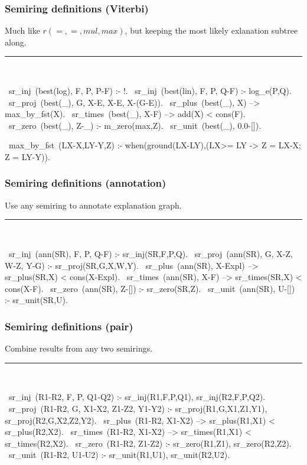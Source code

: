 \documentclass[usenames,dvipsnames]{beamer}
\newenvironment{isframe}[1][untitled]{\begin{frame}[fragile=singleslide,environment=isframe]\frametitle{#1}}{\end{frame}}
\begin{document}
\begin{isframe}[Semiring definitions (Viterbi)]
  Much like $r(=,=,mul,max)$, but keeping the most likely exlanation
  subtree along.
  \rule{\linewidth}{0.4pt}\\
  \begin{prolog}[xleftmargin=0em,deletekeywords={ground},basicstyle=\small]
  ~sr_inj~(best(log), F, P, P-F) :- !.
  ~sr_inj~(best(lin), F, P, Q-F)   :- log_e(P,Q).
  ~sr_proj~(best(_),  G, X-E, X-E, X-(G-E)).
  ~sr_plus~(best(_),  X) --> max_by_fst(X).
  ~sr_times~(best(_),  X-F) --> add(X) <\> cons(F).
  ~sr_zero~(best(_),  Z-_)   :- m_zero(max,Z).
  ~sr_unit~(best(_),  0.0-[]).

  ~max_by_fst~(LX-X,LY-Y,Z) :- 
    when(ground(LX-LY),(LX>= LY -> Z = LX-X; Z = LY-Y)).
\end{prolog}
\end{isframe}

\begin{isframe}[Semiring definitions (annotation)]
Use any semiring to annotate explanation graph.
\rule{\linewidth}{0.4pt}\\
\begin{prolog}[xleftmargin=0em,basicstyle=\small]
  ~sr_inj~(ann(SR),   F, P, Q-F)   :- sr_inj(SR,F,P,Q).
  ~sr_proj~(ann(SR),  G, X-Z, W-Z, Y-G)     :- sr_proj(SR,G,X,W,Y).
  ~sr_plus~(ann(SR),  X-Expl) --> sr_plus(SR,X) <\> cons(X-Expl).
  ~sr_times~(ann(SR),  X-F) --> sr_times(SR,X) <\> cons(X-F).
  ~sr_zero~(ann(SR),  Z-[])  :- sr_zero(SR,Z).
  ~sr_unit~(ann(SR),  U-[])  :- sr_unit(SR,U).
\end{prolog}
\end{isframe}

\begin{isframe}[Semiring definitions (pair)]
Combine results from any two semirings.
\rule{\linewidth}{0.4pt}\\
\begin{prolog}[xleftmargin=0em,basicstyle=\small]
  ~sr_inj~(R1-R2, F, P, Q1-Q2) :- sr_inj(R1,F,P,Q1), sr_inj(R2,F,P,Q2).
  ~sr_proj~(R1-R2, G, X1-X2, Z1-Z2, Y1-Y2) :- 
    sr_proj(R1,G,X1,Z1,Y1), sr_proj(R2,G,X2,Z2,Y2).
  ~sr_plus~(R1-R2, X1-X2) --> sr_plus(R1,X1) <\> sr_plus(R2,X2).
  ~sr_times~(R1-R2, X1-X2) --> sr_times(R1,X1) <\> sr_times(R2,X2).
  ~sr_zero~(R1-R2, Z1-Z2) :- sr_zero(R1,Z1), sr_zero(R2,Z2).
  ~sr_unit~(R1-R2, U1-U2) :- sr_unit(R1,U1), sr_unit(R2,U2).
\end{prolog}
\end{isframe}
\end{document}
